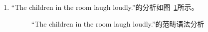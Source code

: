 \begin{enumerate}
\item “The children in the room laugh loudly.”的分析如图~\ref{Abbildung-CG-Kinder-lachen-laut}所示。
\begin{figure}[H]
\centerline{%
}
\caption{\label{Abbildung-CG-Kinder-lachen-laut}“The children in
    the room laugh loudly.”的范畴语法分析}
\end{figure}%


\end{enumerate}
